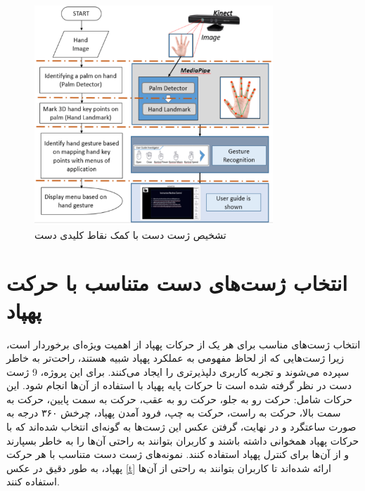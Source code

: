 \begin{figure}[h]
    \centering
    \includegraphics[width=0.8\textwidth]{gesture.png}
    \caption{تشخیص ژست دست با کمک نقاط کلیدی دست}
\end{figure}



\section{انتخاب ژست‌های دست متناسب با حرکت پهپاد}
انتخاب ژست‌های مناسب برای هر یک از حرکات پهپاد از اهمیت ویژه‌ای برخوردار است، زیرا ژست‌هایی که از لحاظ مفهومی به عملکرد پهپاد شبیه هستند، راحت‌تر به خاطر سپرده می‌شوند و تجربه کاربری دلپذیرتری را ایجاد می‌کنند. برای این پروژه، 9 ژست دست در نظر گرفته شده است تا حرکات پایه پهپاد با استفاده از آن‌ها انجام شود. 
این حرکات شامل: حرکت رو به جلو، حرکت رو به عقب، حرکت به سمت پایین، حرکت به سمت بالا،
حرکت به راست، حرکت به چپ، فرود آمدن پهپاد، چرخش ۳۶۰ درجه به صورت ساعتگرد و در نهایت، گرفتن عکس 
این ژست‌ها به گونه‌ای انتخاب شده‌اند که با حرکات پهپاد همخوانی داشته باشند و کاربران بتوانند به راحتی آن‌ها را به خاطر بسپارند و از آن‌ها برای کنترل پهپاد استفاده کنند. نمونه‌های ژست دست متناسب با هر حرکت پهپاد، به طور دقیق در عکس \ref{t} ارائه شده‌اند تا کاربران بتوانند به راحتی از آن‌ها استفاده کنند.

